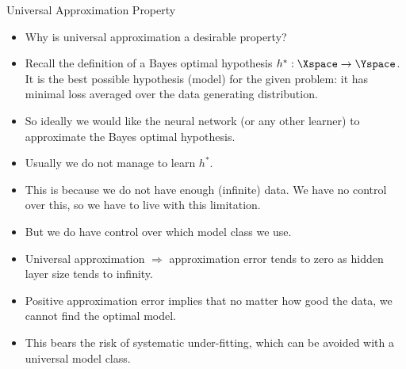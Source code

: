 \begin{vbframe}{Universal Approximation Property}
  \begin{itemize}
  \item Why is universal approximation a desirable property?
  \vspace{2mm}
  \item Recall the definition of a Bayes optimal hypothesis $h^*: \Xspace \to \Yspace$.
    It is the best possible hypothesis (model) for the given problem:
    it has minimal loss averaged over the data generating distribution.
  \vspace{2mm}
  \item So ideally we would like the neural network (or any other
    learner) to approximate the Bayes optimal hypothesis.
  \vspace{2mm}
  \item Usually we do not manage to learn $h^*$.
  \vspace{2mm}
  \item This is because we do not have enough (infinite) data. We have
    no control over this, so we have to live with this limitation.
  \vspace{2mm}
  \item But we do have control over which model class we use.
  \end{itemize}

  \framebreak

  \begin{itemize}
    \vspace{10mm}
    \item Universal approximation $\Rightarrow$ approximation error tends
    to zero as hidden layer size tends to infinity.
    \vspace{5mm}
    \item Positive approximation error implies that no matter how good
    the data, we cannot find the optimal model.
    \vspace{5mm}
    \item This bears the risk of systematic under-fitting, which can be avoided with a universal model class.
  \end{itemize}

  \framebreak


\end{vbframe}
